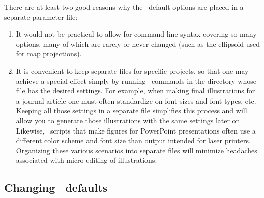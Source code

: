 There are at least two good reasons why the \GMT\ default options
are placed in a separate parameter file:

\begin{enumerate}

\item It would not be practical to allow for command-line syntax
covering so many options, many of which are rarely or never
changed (such as the ellipsoid used for map projections).

\item It is convenient to keep separate 
files for specific projects, so that one may achieve a special
effect simply by running \GMT\ commands in the directory whose
 file has the desired settings.  For example,
when making final illustrations for a journal article one must often
standardize on font sizes and font types, etc.  Keeping all those
settings in a separate  file simplifies this
process and will allow you to generate those illustrations with the same settings later on.  Likewise, \GMT\ scripts that make figures for PowerPoint
presentations often use a different color scheme and font size than
output intended for laser printers.  Organizing these various scenarios
into separate  files will minimize headaches
associated with micro-editing of illustrations.


\end{enumerate}

\subsection{Changing \gmt\ defaults}

